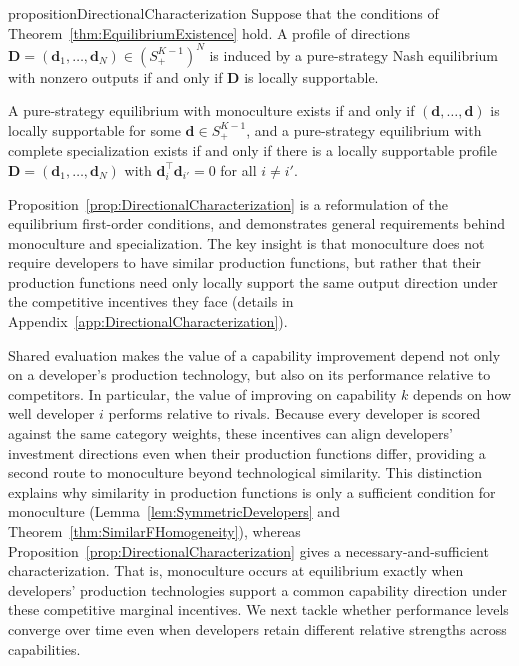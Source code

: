 \begin{restatable}
{proposition}{DirectionalCharacterization}
\label{prop:DirectionalCharacterization}
Suppose that the conditions of Theorem~\ref{thm:EquilibriumExistence} hold.
A profile of directions $\mathbf{D}=(\mathbf d_1,\ldots,\mathbf d_N)\in(S_+^{K-1})^N$
is induced by a pure-strategy Nash equilibrium with nonzero outputs if and only if $\mathbf{D}$ is locally supportable.

A pure-strategy equilibrium with monoculture exists if and only if $(\mathbf d,\ldots,\mathbf d)$ is locally supportable for some $\mathbf d\in S_+^{K-1}$, and a pure-strategy equilibrium with complete specialization exists if and only if there is a locally supportable profile $\mathbf{D}=(\mathbf d_1,\ldots,\mathbf d_N)$ with $\mathbf d_i^\top \mathbf d_{i'}=0$ for all $i \neq i'$.
\end{restatable}

Proposition~\ref{prop:DirectionalCharacterization} is a reformulation of the equilibrium first-order conditions, and demonstrates general requirements behind monoculture and specialization.
The key insight is that monoculture does not require developers to have similar production functions, but rather that their production functions need only locally support the same output direction under the competitive incentives they face
(details in Appendix~\ref{app:DirectionalCharacterization}).

Shared evaluation makes the value of a capability improvement depend not only on a developer's production technology, but also on its performance relative to competitors. 
In particular, the value of improving on capability $k$ depends on how well developer $i$ performs relative to rivals. 
Because every developer is scored against the same category weights, these incentives can align developers' investment directions even when their production functions differ, providing a second route to monoculture beyond technological similarity. 
This distinction explains why similarity in production functions is only a sufficient condition for monoculture (Lemma~\ref{lem:SymmetricDevelopers} and Theorem~\ref{thm:SimilarFHomogeneity}), whereas Proposition~\ref{prop:DirectionalCharacterization} gives a necessary-and-sufficient characterization.
That is, monoculture occurs at equilibrium exactly when developers' production technologies support a common capability direction under these competitive marginal incentives.
We next tackle whether performance levels converge over time even when developers retain different relative strengths across capabilities.
